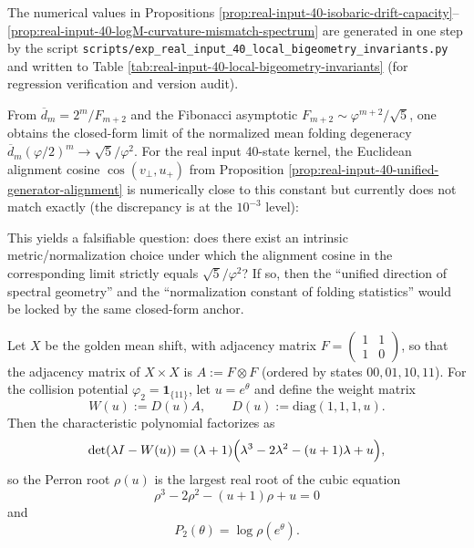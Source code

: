 \begin{remark}\label{rem:real-input-40-local-bigeometry-script}
The numerical values in Propositions \ref{prop:real-input-40-isobaric-drift-capacity}--\ref{prop:real-input-40-logM-curvature-mismatch-spectrum} are generated in one step by the script \texttt{scripts/exp\_real\_input\_40\_local\_bigeometry\_invariants.py} and written to Table \ref{tab:real-input-40-local-bigeometry-invariants} (for regression verification and version audit).
\end{remark}


\begin{remark}\label{rem:alignment-cos-vs-sqrt5-phi2}
From \(\overline d_m=2^m/F_{m+2}\) and the Fibonacci asymptotic \(F_{m+2}\sim \varphi^{m+2}/\sqrt5\), one obtains the closed-form limit of the normalized mean folding degeneracy
\(
\overline d_m(\varphi/2)^m\to \sqrt5/\varphi^2
\).
For the real input 40-state kernel, the Euclidean alignment cosine
\(\cos(v_\perp,u_+)\) from Proposition \ref{prop:real-input-40-unified-generator-alignment} is numerically close to this constant but currently does not match exactly (the discrepancy is at the \(10^{-3}\) level):

This yields a falsifiable question: does there exist an intrinsic metric/normalization choice under which the alignment cosine in the corresponding limit strictly equals \(\sqrt5/\varphi^2\)?
If so, then the ``unified direction of spectral geometry'' and the ``normalization constant of folding statistics'' would be locked by the same closed-form anchor.
\end{remark}

\begin{proposition}\label{prop:real-input-40-collision-pressure}
Let $X$ be the golden mean shift, with adjacency matrix
\(
F=\begin{pmatrix}1&1\\[2pt]1&0\end{pmatrix}
\), so that the adjacency matrix of $X\times X$ is $A:=F\otimes F$ (ordered by states $00,01,10,11$).
For the collision potential $\varphi_2=\mathbf{1}_{\{11\}}$, let $u=e^\theta$ and define the weight matrix
\[
W(u):=D(u)A,\qquad D(u):=\mathrm{diag}(1,1,1,u).
\]
Then the characteristic polynomial factorizes as
\[
\det(\lambda I-W(u))=(\lambda+1)\Bigl(\lambda^3-2\lambda^2-(u+1)\lambda+u\Bigr),
\]
so the Perron root $\rho(u)$ is the largest real root of the cubic equation
\[
\rho^3-2\rho^2-(u+1)\rho+u=0
\]
and
\[
P_2(\theta)=\log\rho(e^\theta).
\]
\end{proposition}

